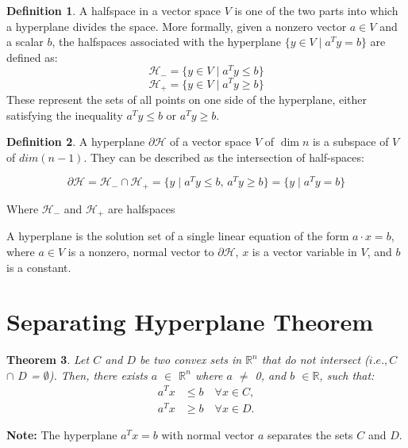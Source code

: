 \documentclass[11pt]{amsart} %
\newtheorem{thm}{Theorem}[section]
\theoremstyle{definition}
\newtheorem{defn}[thm]{Definition}
\begin{document}
\begin{defn} A halfspace in a vector space \( V \) is one of the two parts into which a hyperplane divides the space. More formally, given a nonzero vector \( a \in V \) and a scalar \( b \), the halfspaces associated with the hyperplane \( \{ y \in V \mid a^T y = b \} \) are defined as:
\[
\mathcal{H}_- = \{ y \in V \mid a^T y \leq b \}
\]
\[
\mathcal{H}_+ = \{ y \in V \mid a^T y \geq b \}
\]
These represent the sets of all points on one side of the hyperplane, either satisfying the inequality \( a^T y \leq b \) or \( a^T y \geq b \).
\end{defn}

\begin{defn} A hyperplane \(\partial \mathcal{H}\) of a vector space $V$ of $\dim n$ is a subspace of $V$ of \(dim (n-1)\). They can be described as the intersection of half-spaces:

\[
\partial \mathcal{H} = \mathcal{H}_- \cap \mathcal{H}_+ = \{ y \mid a^T y \leq b, \, a^T y \geq b \} = \{ y \mid a^T y = b \}
\]

\begin{center}
    Where \(\mathcal{H}_-\) and \(\mathcal{H}_+\) are halfspaces
\end{center}


A hyperplane is the solution set of a single linear equation of the form $a \cdot x = b$, where \(a \in V\) is a nonzero, normal vector to \(\partial \mathcal{H}\), ${x}$ is a vector variable in $V$, and $b$ is a constant.
\end{defn}



\section{Separating Hyperplane Theorem}
\begin{thm}
    Let $C$ and $D$ be two convex sets in $\mathbb{R}^n$ that do not intersect ($i.e., C$ $\cap$ $D$ = $\emptyset$). 
Then, there exists $a$ $\in$ $\mathbb{R}^n$ where $a$ $\neq$ 0, and $b$ $\in \mathbb{R}$, such that:
\begin{align*}
    a^T x &\leq b \quad \forall x \in C, \\
    a^T x &\geq b \quad \forall x \in D.
\end{align*}
\end{thm}

\textbf{Note:} The hyperplane \( a^T x = b \) with normal vector \( a \) separates the sets \( C \) and \( D \).\\
\end{document}
